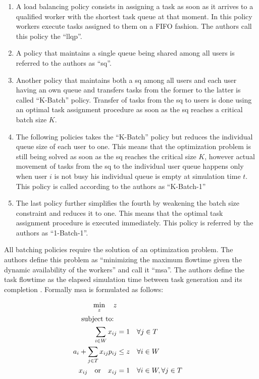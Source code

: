 \documentclass{seal_thesis}
\begin{document}
\begin{enumerate}
	\item A load balancing policy consists in assigning a task as soon as it arrives to a qualified worker with the shortest task queue at that moment. In this policy workers execute tasks assigned to them on a FIFO fashion. The authors call this policy the ``\gls{llqp}''.
	\item A policy that maintains a single queue being shared among all users is referred to the authors as ``\gls{sq}''.
	\item Another policy that maintains both a \gls{sq} among all users and each user having an own queue and transfers tasks from the former to the latter is called ``K-Batch'' policy. Transfer of tasks from the \gls{sq} to users is done using an optimal task assignment procedure as soon as the \gls{sq} reaches a critical batch size $K$.
	\item The following policies takes the ``K-Batch'' policy but reduces the individual queue size of each user to one. This means that the optimization problem is still being solved as soon as the \gls{sq} reaches the critical size $K$, however actual movement of tasks from the \gls{sq} to the individual user queue happens only when user $i$ is not busy \ie his individual queue is empty at simulation time $t$. This policy is called according to the authors as ``K-Batch-1''
	\item The last policy further simplifies the fourth by weakening the batch size constraint and reduces it to one. This means that the optimal task assignment procedure is executed immediately. This policy is referred by the authors as ``1-Batch-1''.
\end{enumerate}

All batching policies require the solution of an optimization problem. The authors define this problem as ``minimizing the maximum flowtime given the dynamic availability of the workers'' and call it ``\gls{msa}''\cite[p. 7]{Zeng2005}. The authors define the task flowtime as the elapsed simulation time between task generation and its completion \cite{Zeng2005,Baker1974}. Formally \gls{msa} is formulated as follows:

\begin{align}
    \min_z \quad z\\
    \text{subject to: } \notag \\
    \sum_{i \in W} x_{ij} &= 1 \quad \forall j \in T\\
    a_i + \sum_{j \in T} x_{ij} p_{ij} &\leq z \quad \forall i \in W\\
    x_{ij} \quad \text{or} \quad x_{ij}&=1 \quad \forall i \in W, \forall j \in T
\end{align}
\end{document}

